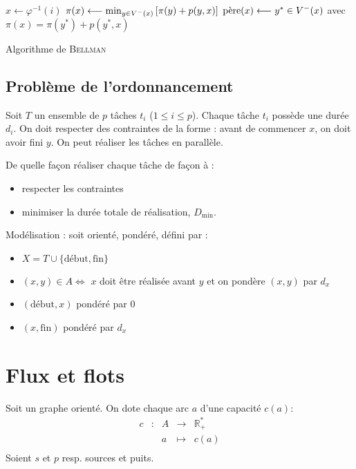 \documentclass[a4paper, 8pt]{article}
\begin{document}
\begin{multicols*}{3}
\begin{algorithm}[H]
 {
 	$x \longleftarrow \varphi^{-1}(i)$ \;
 	$\pi(x) \longleftarrow \min_{y\in \Vm(x)}\left[\pi(y) + p(y,x)\right]$ \;
 	{\footnotesize {} }
 	$\pere(x) \longleftarrow y^*\in \Vm(x)$ avec $\pi(x) = \pi(y^*) + p(y^*,x)$ \;
 }
 
 \caption{Algorithme de \textsc{Bellman}}
\end{algorithm}

 \subsection*{Problème de l'ordonnancement}
 
\newcommand{\Dmin}{D_{\text{min}}} 
\newcommand{\debut}{\text{début}}
\newcommand{\fin}{\text{fin}}
 
 Soit $T$ un ensemble de $p$ tâches $t_i$ ($1\leqslant i\leqslant p$). Chaque tâche $t_i$ possède une durée $d_i$. On doit respecter des contraintes de la forme : avant de commencer $x$, on doit avoir fini $y$. On peut réaliser les tâches en parallèle.
 
De quelle façon réaliser chaque tâche de façon à :
\begin{itemize}
	\item respecter les contraintes
	\item minimiser la durée totale de réalisation, $\Dmin$.
\end{itemize}

Modélisation : soit \GXA orienté, pondéré, défini par :
\begin{itemize}
	\item $X = T \cup \{\debut,\fin\}$
	\item $(x,y)\in A \Longleftrightarrow$ $x$ doit être réalisée avant $y$ et on pondère $(x,y)$ par $d_x$
	\item $(\debut,x)$ pondéré par 0
	\item $(x,\fin)$ pondéré par $d_x$
\end{itemize}



\section*{Flux et flots}
\newcommand{\Sb}{\overline{S}}

Soit \GXA un graphe orienté. On dote chaque arc $a$ d'une capacité $c(a)$:
\[
\begin{array}{cc|ccl}
c & : & A & \to & \mathbb{R}^*_+  \\
 & & a & \mapsto & c(a) \\
\end{array}
\]
Soient $s$ et $p$ resp. sources et puits.


\end{multicols*}
\end{document}
